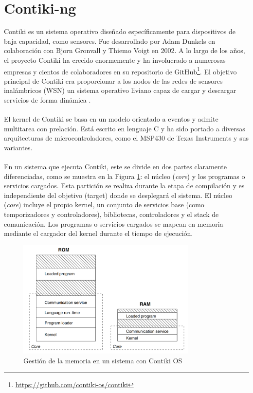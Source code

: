 \section{Contiki-ng}
\label{sec:contikiNG}

Contiki es un sistema operativo diseñado específicamente para dispositivos de baja capacidad, como sensores. Fue desarrollado por Adam Dunkels en colaboración con Bjorn Gronvall y Thiemo Voigt en 2002. A lo largo de los años, el proyecto Contiki ha crecido enormemente y ha involucrado a numerosas empresas y cientos de colaboradores en su repositorio de GitHub\footnote{\url{https://github.com/contiki-os/contiki}}. El objetivo principal de Contiki era proporcionar a los nodos de las redes de sensores inalámbricos (WSN) un sistema operativo liviano capaz de cargar y descargar servicios de forma dinámica \cite{1367266}.\\
\\
El kernel de Contiki se basa en un modelo orientado a eventos y admite multitarea con prelación. Está escrito en lenguaje C y ha sido portado a diversas arquitecturas de microcontroladores, como el MSP430 de Texas Instruments y sus variantes.\\
\\
En un sistema que ejecuta Contiki, este se divide en dos partes claramente diferenciadas, como se muestra en la Figura \ref{fig:contikiParts}: el núcleo (\textit{core}) y los programas o servicios cargados. Esta partición se realiza durante la etapa de compilación y es independiente del objetivo (target) donde se desplegará el sistema. El núcleo (\textit{core}) incluye el propio kernel, un conjunto de servicios base (como temporizadores y controladores), bibliotecas, controladores y el stack de comunicación. Los programas o servicios cargados se mapean en memoria mediante el cargador del kernel durante el tiempo de ejecución.\\


\begin{figure}[ht]
    \centering
    \includegraphics[width=0.8\textwidth]{archivos/img/teoria/contiki.png}
    \caption{Gestión de la memoria en un sistema con Contiki OS \cite{1367266}}
    \label{fig:contikiParts}
\end{figure}


